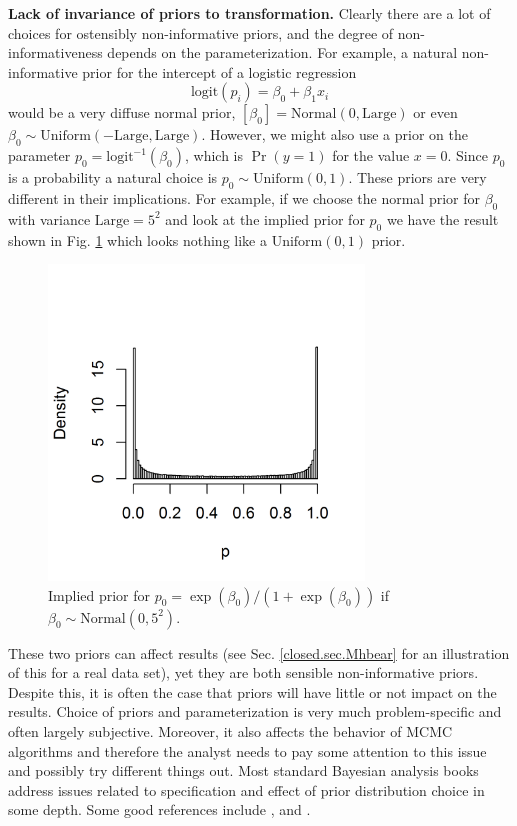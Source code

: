 {\bf Lack of invariance of priors to transformation.} Clearly there
are a lot of choices for ostensibly non-informative priors, and the
degree of non-informativeness depends on the parameterization. For
example, a natural non-informative prior for the intercept of a
logistic regression
\[
\mbox{logit}(p_{i}) = \beta_0 + \beta_1 x_{i}
\]
would be a very diffuse normal prior,
$[\beta_0] = \mbox{Normal}(0,\mbox{Large})$ or even
 $\beta_0 \sim
\mbox{Uniform}(-\mbox{Large},\mbox{Large})$.
However, we might also use a prior on the parameter $p_0
= \mbox{logit}^{-1}(\beta_0)$, which is $\Pr(y=1)$ for the value $x=0$. 
Since $p_0$ is a
probability a natural choice is $p_0 \sim \mbox{Uniform}(0,1)$. 
These priors are very different in their implications. For example, if
we choose the normal prior for $\beta_0$ with variance
$\mbox{Large} = 5^2$ and look at the implied prior for $p_{0}$
we have the result shown in Fig. \ref{glms.fig.impliedprior}
which looks nothing like a $\mbox{Uniform}(0,1)$ prior.
\begin{figure}[htp]
\begin{center}
\includegraphics[height=3.3in]{Ch2-Bayes/figs/implied_prior}
\end{center}
\caption{Implied prior for $p_{0} = \exp(\beta_0)/(1+\exp(\beta_0))$ 
if $\beta_0 \sim \mbox{Normal}(0, 5^2)$.}
\label{glms.fig.impliedprior}
\end{figure}
These two priors can affect results (see Sec. \ref{closed.sec.Mhbear}
for an illustration of this for a real data set), yet they are both
sensible non-informative priors. Despite this, it is often the case
that priors will have little or not impact on the results.
Choice of priors and parameterization
is very much problem-specific and often largely subjective. Moreover,
it also affects the behavior of MCMC algorithms and therefore the
analyst needs to pay some attention to this issue and possibly try
different things out.  Most standard Bayesian analysis books address
issues related to specification and effect of prior distribution
choice in some depth. Some good references include
\citet{kass_wasserman:1996}, \citet{gelman:2006} and
\citet{link_barker:2010}.


